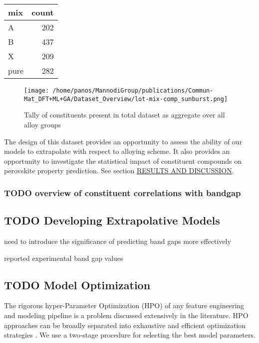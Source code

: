 \documentclass[aip, jmp, amsmath, amssymb]{revtex4-2}
\begin{document}
\begin{center}
\begin{tabular}{lr}
mix & count\\
\hline
A & 202\\
B & 437\\
X & 209\\
pure & 282\\
\end{tabular}
\end{center}

\begin{figure*}
\centering
\texttt{[image: /home/panos/MannodiGroup/publications/Commun-Mat\_DFT+ML+GA/Dataset\_Overview/lot-mix-comp\_sunburst.png]}
\caption{\label{fig:comp} Tally of constituents present in total dataset as aggregate over all alloy groups}
\end{figure*}

The design of this dataset provides an opportunity to assess the
ability of our models to extrapolate with respect to alloying
scheme. It also provides an opportunity to investigate the statistical
impact of constituent compounds on perovskite property prediction. See
section \hyperref[sec:orgb4cd6ae]{RESULTS AND DISCUSSION}.
\subsubsection*{{\bfseries\sffamily TODO} overview of constituent correlations with bandgap}
\label{sec:org0e6da1a}
\subsection*{{\bfseries\sffamily TODO} Developing Extrapolative Models}
\label{sec:orgeb8df3f}
need to introduce the significance of predicting band gaps more
effectively

reported experimental band gap values\cite{kim-2014-cdses-nanow,swanson-2017-co-sublim}

\subsection*{{\bfseries\sffamily TODO} Model Optimization}
\label{sec:org43705c5}
The rigorous hyper-Parameter Optimization (HPO) of any feature
engineering and modeling pipeline is a problem discussed extensively
in the literature. HPO approaches can be broadly separated into
exhaustive and efficient optimization strategies
\cite{yang-2020-hyper-optim}. We use a two-stage procedure for
selecting the best model parameters.
\end{document}
